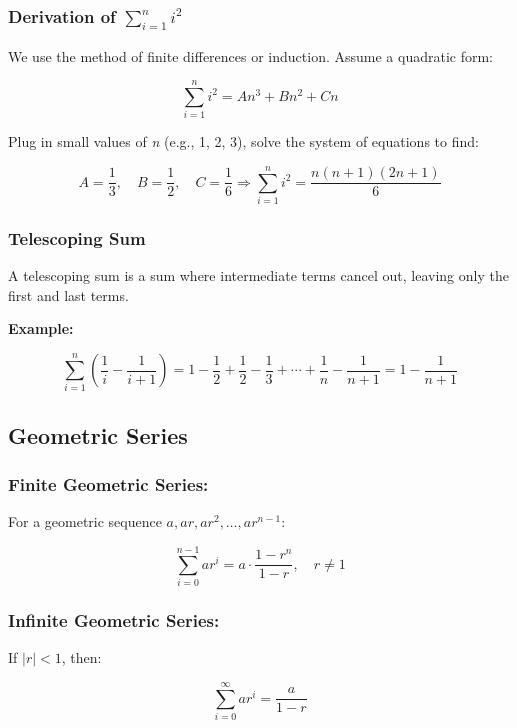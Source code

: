 \subsubsection{Derivation of \texorpdfstring{\(\sum_{i=1}^{n} i^2\)}{∑i²}}

We use the method of finite differences or induction. Assume a quadratic form:

\[
    \sum_{i=1}^{n} i^2 = An^3 + Bn^2 + Cn
\]

Plug in small values of \emph{n} (e.g., 1, 2, 3), solve the system of equations to find:

\[
    A = \frac{1}{3}, \quad B = \frac{1}{2}, \quad C = \frac{1}{6}
    \Rightarrow \sum_{i = 1}^{n} i^2 = \frac{n(n+1)(2n+1)}{6}
\]

\subsubsection{Telescoping Sum}

A telescoping sum is a sum where intermediate terms cancel out, leaving only the first and last terms.
\vspace{\baselineskip}

\textbf{Example:}

\[
    \sum_{i=1}^{n} \left( \frac{1}{i} - \frac{1}{i+1} \right)
    = 1 - \frac{1}{2} + \frac{1}{2} - \frac{1}{3} + \cdots + \frac{1}{n} - \frac{1}{n+1}
    = 1 - \frac{1}{n+1}
\]

\subsection{Geometric Series}

\subsubsection{Finite Geometric Series:}

For a geometric sequence \(a, ar, ar^2, \dots, ar^{n-1}\):

\[
    \sum_{i = 0}^{n - 1} ar^i = a \cdot \frac{1 - r^n}{1 - r}, \quad r \ne 1
\]

\subsubsection{Infinite Geometric Series:}

If \(|r| < 1\), then:

\[
    \sum_{i = 0}^{\infty} ar^i = \frac{a}{1 - r}
\]

